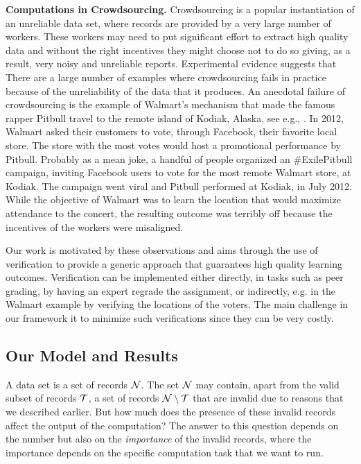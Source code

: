 \noindent \textbf{Computations in Crowdsourcing.} Crowdsourcing \cite{DoanRH2011} is a popular instantiation of an unreliable data set,
where records are provided by a very large number of workers. These workers may need to put significant effort to extract high quality data
and without the right incentives they might choose not to do so giving, as a result, very noisy and unreliable reports. Experimental evidence
\cite{KazaiKKM2011, VuurensVE2011, WaisLCFGLMS2010} suggests that There are a large number of examples where crowdsourcing fails in practice
because of the unreliability of the data that it produces. An anecdotal failure of crowdsourcing is the example of Walmart's mechanism that
made the famous rapper Pitbull travel to the remote island of Kodiak, Alaska, see e.g., \cite{Pitbull12}. In 2012, Walmart asked their
customers to vote, through Facebook, their favorite local store. The store with the most votes would host a promotional performance by Pitbull.
Probably as a mean joke, a handful of people organized an \#ExilePitbull campaign, inviting Facebook users to vote for the most remote Walmart
store, at Kodiak. The campaign went viral and Pitbull performed at Kodiak, in July 2012. While the objective of Walmart was to learn the
location that would maximize attendance to the concert, the resulting outcome was terribly off because the incentives of the workers were
misaligned.

  Our work is motivated by these observations and aims through the use of verification to provide a generic approach that
guarantees high quality learning outcomes. Verification can be implemented either directly, in tasks such as peer grading,
by having an expert regrade the assignment, or indirectly, e.g. in the Walmart example by verifying the locations of the
voters. The main challenge in our framework it to minimize such verifications since they can be very costly.

\subsection{Our Model and Results}

  A data set is a set of records $\mathcal{N}$. The set $\mathcal{N}$ may contain, apart from the valid subset of records $\mathcal{T}$, a set of records
$\mathcal{N} \setminus \mathcal{T}$ that are invalid due to reasons that we described earlier. But how much does the presence of these invalid records
affect the output of the computation? The answer to this question depends on the number but also on the \textit{importance} of the invalid
records, where the importance depends on the specific computation task that we want to run.
%

